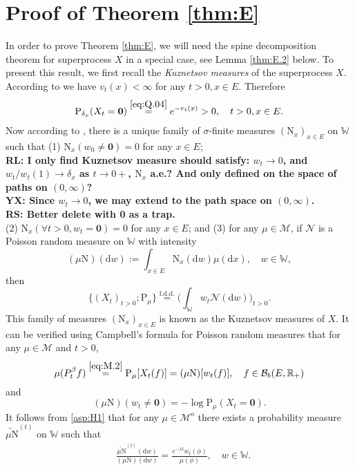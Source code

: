 \documentclass[12pt,a4paper]{amsart}
\numberwithin{equation}{section}
\theoremstyle{plain}
\theoremstyle{definition}
\theoremstyle{remark}
\begin{document}
\section{Proof of Theorem \ref{thm:E}} \label{sec:E}
	In order to prove Theorem \ref{thm:E}, we will need 
the spine decomposition theorem for superprocess $X$ in a special case, see Lemma \ref{thm:E.2} below.	
	To present this result, we first recall the \emph{Kuznetsov  measures} of the superprocess $X$.
	According to \cite[Proposition 1.3]{LiuRenSongSun2020} we have $v_t(x)<\infty$ for any $t>0, x\in E$.
	Therefore
\begin{align}
	\mathrm P_{\delta_x}(X_t = \mathbf 0) \overset{\eqref{eq:Q.04}}
	= e^{-v_t(x)} > 0, \quad t>0, x\in E.
\end{align}
	Now according to \cite[Section 8.4]{Li2011Measure-valued}, there is a unique family of $\sigma$-finite measures
	$(\mathrm N_x)_{x\in E}$
	on $\mathbb W$ such that
	(1) $\mathrm N_x(w_0 \neq \mathbf 0) = 0$ for any $x\in E$;\\
{\color{red}\bf RL: I only find Kuznetsov measure should satisfy: $w_t\to 0$, and $w_t/w_t(1)\to \delta_x$ as $t\to 0+$, $\mathrm N_x$ a.e.? And only defined on the space of paths on $(0,\infty)$?\\
YX: Since $w_t\to 0$, we may extend to the path space on  $(0,\infty)$.\\
RS: Better delete with 0 as a trap.}\\
	(2) $\mathrm N_x (\forall t > 0, w_t =\mathbf 0) =0$ for any $x\in E$;
	and (3) for any $\mu \in \mathcal M$, if $\mathcal N$ is a Poisson random measure on $\mathbb W$ with intensity
	\[
	(\mu\mathrm N)(\mathrm dw):=
	\int_{x\in E} \mathrm N_x(\mathrm dw)\mu(\mathrm dx), \quad w\in \mathbb W,
	\]
	then
	\begin{equation}
	\{(X_t)_{t> 0};\mathrm P_\mu\}
	\overset{\text{f.d.d.}}= \Big(\int_{\mathbb W} w_t\mathcal N(\mathrm dw)\Big)_{t> 0}.
	\end{equation}
	This family of measures $(\mathrm N_x)_{x\in E}$ is known as the Kuznetsov measures of $X$.
	It can be verified using Campbell's formula for Poisson random measures that for any $\mu\in \mathcal M$ and $t>0$,
\begin{equation} \label{eq:E.13}
	\mu(P_t^\beta f)
	\overset{\eqref{eq:M.2}}= \mathrm P_\mu[X_t(f)]
	=(\mu \mathrm N) [w_t(f)],
	\quad f\in \mathcal B_b(E, \mathbb R_+)
\end{equation}
	and
\begin{equation} \label{eq:E.14}
	(\mu\mathrm N) (w_t\neq \mathbf 0)
	= - \log \mathrm P_{\mu}(X_t = \mathbf 0).
\end{equation}
	It follows from \eqref{asp:H1} that for any $\mu\in \mathcal M^o$ there exists a probability measure $\widetilde {\mu \mathrm N}^{(t)}$ on $\mathbb W$ such that
	\begin{align}\label{eq:E.15}
	& \frac{\widetilde {\mu \mathrm N}^{(t)}(\mathrm dw) }{(\mu \mathrm N)(\mathrm dw)}
	= \frac{e^{-\lambda t}w_t(\phi)}{\mu(\phi)}, \quad w\in \mathbb W.
	\end{align}
\end{document}

